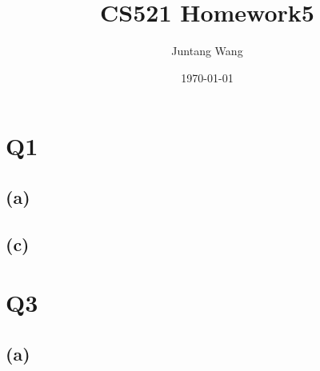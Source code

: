 \documentclass[12pt]{article} %
\title{CS521 Homework5} %
\author{Juntang Wang}        %
\date{\today}             %
\begin{document}
\section{Q1}
\subsection{(a)}

\subsection{(c)}


\section{Q3}
\subsection{(a)}


\printbibliography
\end{document}
